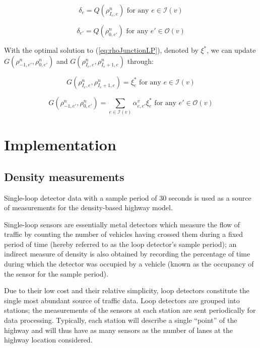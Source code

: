 \documentclass[letterpaper,10pt]{article}
\begin{document}
\begin{equation}\label{eq:rhoUpperBound1}
\delta_{e} = Q(\rho^{n}_{I_{e},e}) \text{ for any } e \in \mathcal{I}(v)
\end{equation}

\begin{equation}\label{eq:rhoUpperBound2}
\delta_{e'} = Q(\rho^{n}_{0,e'}) \text{ for any } e' \in \mathcal{O}(v)
\end{equation}

\noindent With the optimal solution to (\ref{eq:rhoJunctionLP}), denoted by $\xi^{*}$, we can update $G(\rho^{n}_{-1,e'},\rho^{n}_{0,e'})$ and $G(\rho^{n}_{I_{e},e},\rho^{n}_{I_{e}+1,e})$ through:

\begin{equation}\label{eq:rhoUpdateBound1}
G(\rho^{n}_{I_{e},e},\rho^{n}_{I_{e}+1,e}) = \xi^{*}_{e} \text{ for any } e \in \mathcal{I}(v)
\end{equation}

\begin{equation}\label{eq:rhoUpdateBound2}
G(\rho^{n}_{-1,e'},\rho^{n}_{0,e'}) = \displaystyle\sum\limits_{e\in \mathcal{I}(v)} \alpha^{v}_{e,e'} \xi^{*}_{e} \text{ for any } e' \in \mathcal{O}(v)
\end{equation}

\newpage
\section{Implementation}

\subsection{Density measurements}
Single-loop detector data with a sample period of $30$ seconds is used
as a source of measurements for the density-based highway
model.

Single-loop sensors are essentially metal detectors which measure
the flow of traffic by counting the number of vehicles having crossed
them during a fixed period of time (hereby referred to as the loop
detector's sample period); an indirect measure of density is also
obtained by recording the percentage of time during which the detector
was occupied by a vehicle (known as the occupancy of the sensor for
the sample period).

Due to their low cost and their relative simplicity, loop
detectors constitute the single most abundant source of traffic
data. Loop detectors are grouped into stations; the measurements of
the sensors at each station are sent periodically for data
processing. Typically, each station will describe a single ``point''
of the highway and will thus have as many sensors as the number of
lanes at the highway location considered.
\end{document}
